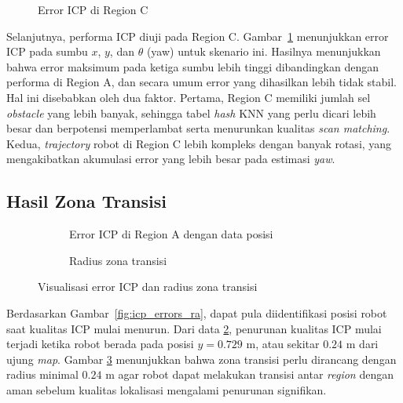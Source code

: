 \begin{figure}[H]
\centering

\caption{Error ICP di Region C}
\label{fig:icp_errors_rc}
\end{figure}

Selanjutnya, performa ICP diuji pada Region C. Gambar~\ref{fig:icp_errors_rc}
menunjukkan error ICP pada sumbu $x$, $y$, dan $\theta$ (yaw) untuk skenario ini.
Hasilnya menunjukkan bahwa error maksimum pada ketiga sumbu lebih tinggi
dibandingkan dengan performa di Region A, dan secara umum error yang dihasilkan
lebih tidak stabil. Hal ini disebabkan oleh dua faktor. Pertama, Region C memiliki
jumlah sel \emph{obstacle} yang lebih banyak, sehingga tabel \emph{hash} KNN yang
perlu dicari lebih besar dan berpotensi memperlambat serta menurunkan kualitas
\emph{scan matching}. Kedua, \emph{trajectory} robot di Region C lebih kompleks
dengan banyak rotasi, yang mengakibatkan akumulasi error yang lebih besar pada
estimasi \emph{yaw}.

\subsection{Hasil Zona Transisi}

\begin{figure}[H]
\centering
\begin{subfigure}[t]{0.4\textwidth}
\vspace{0pt}
\centering

\caption{Error ICP di Region A dengan data posisi}
\label{fig:icp_errors_ra_posy}
\end{subfigure}
\qquad
\begin{subfigure}[t]{0.28\textwidth}
\vspace{0pt}
\centering

\caption{Radius zona transisi}
\label{fig:radius_transition}
\end{subfigure}
\caption{Visualisasi error ICP dan radius zona transisi}
\label{fig:icp_radius_compare}
\end{figure}

Berdasarkan Gambar~\ref{fig:icp_errors_ra}, dapat pula diidentifikasi posisi robot
saat kualitas ICP mulai menurun. Dari data \ref{fig:icp_errors_ra_posy}, penurunan kualitas ICP mulai
terjadi ketika robot berada pada posisi $y = 0.729$ m, atau sekitar $0.24$ m dari
ujung \emph{map}. Gambar \ref{fig:radius_transition} menunjukkan bahwa zona transisi perlu dirancang dengan
radius minimal $0.24$ m agar robot dapat melakukan transisi antar \emph{region}
dengan aman sebelum kualitas lokalisasi mengalami penurunan signifikan.

